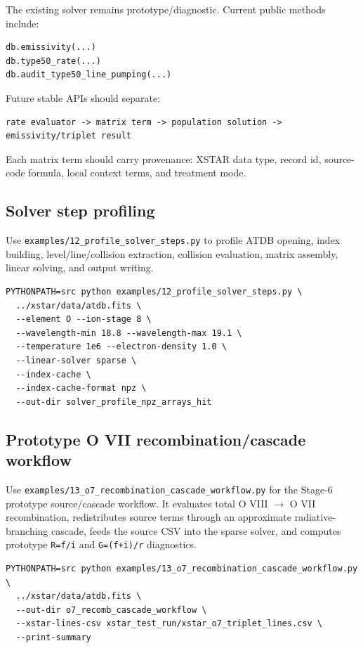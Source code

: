 \documentclass[11pt]{article}
\begin{document}
The existing solver remains prototype/diagnostic. Current public methods include:

\begin{lstlisting}[style=ctpython]
db.emissivity(...)
db.type50_rate(...)
db.audit_type50_line_pumping(...)
\end{lstlisting}

Future stable APIs should separate:

\begin{lstlisting}[style=ctterminal]
rate evaluator -> matrix term -> population solution -> emissivity/triplet result
\end{lstlisting}

Each matrix term should carry provenance: XSTAR data type, record id, source-code formula, local context terms, and treatment mode.

\subsection{Solver step profiling}

Use \texttt{examples/12\_profile\_solver\_steps.py} to profile ATDB opening, index building, level/line/collision extraction, collision evaluation, matrix assembly, linear solving, and output writing.

\begin{lstlisting}[style=ctterminal]
PYTHONPATH=src python examples/12_profile_solver_steps.py \
  ../xstar/data/atdb.fits \
  --element O --ion-stage 8 \
  --wavelength-min 18.8 --wavelength-max 19.1 \
  --temperature 1e6 --electron-density 1.0 \
  --linear-solver sparse \
  --index-cache \
  --index-cache-format npz \
  --out-dir solver_profile_npz_arrays_hit
\end{lstlisting}

\subsection{Prototype O VII recombination/cascade workflow}

Use \texttt{examples/13\_o7\_recombination\_cascade\_workflow.py} for the Stage-6 prototype source/cascade workflow. It evaluates total O VIII $\rightarrow$ O VII recombination, redistributes source terms through an approximate radiative-branching cascade, feeds the source CSV into the sparse solver, and computes prototype \texttt{R=f/i} and \texttt{G=(f+i)/r} diagnostics.

\begin{lstlisting}[style=ctterminal]
PYTHONPATH=src python examples/13_o7_recombination_cascade_workflow.py \
  ../xstar/data/atdb.fits \
  --out-dir o7_recomb_cascade_workflow \
  --xstar-lines-csv xstar_test_run/xstar_o7_triplet_lines.csv \
  --print-summary
\end{lstlisting}
\end{document}
